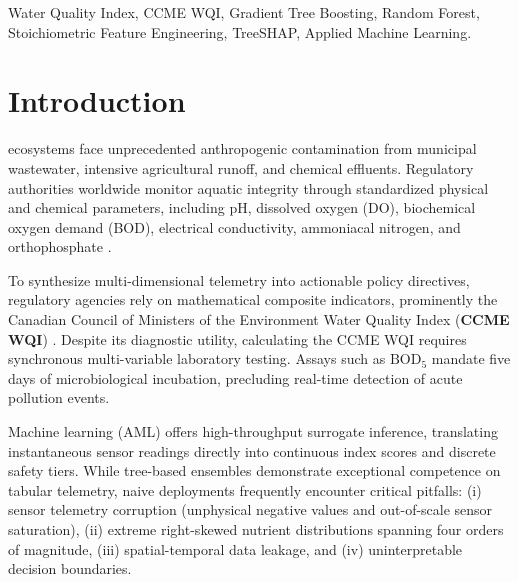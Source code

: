 \documentclass[conference]{IEEEtran}
\begin{document}
\begin{IEEEkeywords}
Water Quality Index, CCME WQI, Gradient Tree Boosting, Random Forest, Stoichiometric Feature Engineering, TreeSHAP, Applied Machine Learning.
\end{IEEEkeywords}

\section{Introduction}
 ecosystems face unprecedented anthropogenic contamination from municipal wastewater, intensive agricultural runoff, and chemical effluents. Regulatory authorities worldwide monitor aquatic integrity through standardized physical and chemical parameters, including pH, dissolved oxygen (DO), biochemical oxygen demand (BOD), electrical conductivity, ammoniacal nitrogen, and orthophosphate \cite{tyree2019surface}. 

To synthesize multi-dimensional telemetry into actionable policy directives, regulatory agencies rely on mathematical composite indicators, prominently the Canadian Council of Ministers of the Environment Water Quality Index (\textbf{CCME WQI}) \cite{ccme2001wqi}. Despite its diagnostic utility, calculating the CCME WQI requires synchronous multi-variable laboratory testing. Assays such as $\text{BOD}_5$ mandate five days of microbiological incubation, precluding real-time detection of acute pollution events.

Machine learning (AML) offers high-throughput surrogate inference, translating instantaneous sensor readings directly into continuous index scores and discrete safety tiers. While tree-based ensembles demonstrate exceptional competence on tabular telemetry, naive deployments frequently encounter critical pitfalls: (i) sensor telemetry corruption (unphysical negative values and out-of-scale sensor saturation), (ii) extreme right-skewed nutrient distributions spanning four orders of magnitude, (iii) spatial-temporal data leakage, and (iv) uninterpretable decision boundaries.
\end{document}
